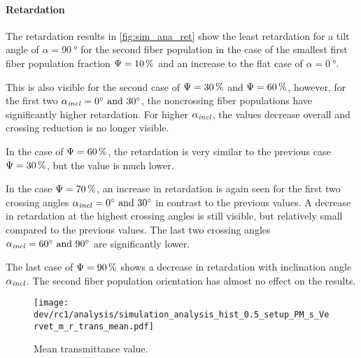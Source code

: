\paragraph{Retardation}
The retardation results in \cref{fig:sim_ana_ret} show the least retardation for a tilt angle of $\alpha=\SI{90}{\degree}$ for the second fiber population in the case of the smallest first fiber population fraction $\textnormal{$\Psi$}=\SI{10}{\percent}$ and an increase to the flat case of $\alpha=\SI{0}{\degree}$.
\par
%
This is also visible for the second case of $\textnormal{$\Psi$}=\SI{30}{\percent}$ and $\textnormal{$\Psi$}=\SI{60}{\percent}$, however, for the first two $\modelInc = \SIlist{0;30}{\degree}$, the noncrossing fiber populations have significantly higher retardation.
For higher $\textnormal{$\alpha_{\mathit{incl}}$}$, the values decrease overall and crossing reduction is no longer visible.
\par
%
In the case of $\textnormal{$\Psi$}=\SI{60}{\percent}$, the retardation is very similar to the previous case $\textnormal{$\Psi$}=\SI{30}{\percent}$, but the value is much lower.
\par
%
In the case $\textnormal{$\Psi$}=\SI{70}{\percent}$, an increase in retardation is again seen for the first two crossing angles $\modelInc=\SIlist{0;30}{\degree}$ in contrast to the previous values.
A decrease in retardation at the highest crossing angles is still visible, but relatively small compared to the previous values.
The last two crossing angles $\modelInc=\SIlist{60;90}{\degree}$ are significantly lower.
\par
%
The last case of $\textnormal{$\Psi$}=\SI{90}{\percent}$ shows a decrease in retardation with inclination angle $\textnormal{$\alpha_{\mathit{incl}}$}$.
The second fiber population orientation has almost no effect on the results.
%
%
%
\begin{figure}[!p]
\centering
\texttt{[image: dev/rc1/analysis/simulation\_analysis\_hist\_0.5\_setup\_PM\_s\_Vervet\_m\_r\_trans\_mean.pdf]}
\caption{Mean transmittance value. }
\label{fig:sim_ana_trans}
\end{figure}
%
